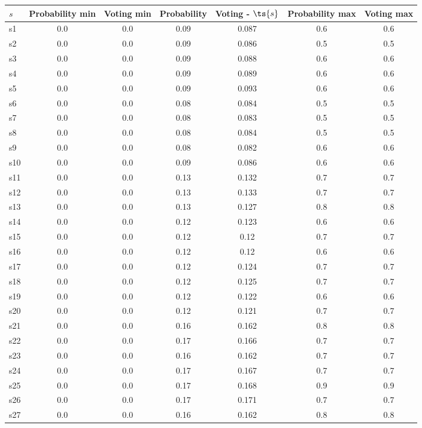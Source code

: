\documentclass{article}
\begin{document}
\noindent\begin{tabular}{|l|c|c|c|c|c|c|}
\hline
$s$& Probability min & Voting min & Probability & Voting - $\ts{s}$ & Probability max & Voting max\\
\hline
s1 &0.0 & 0.0 & 0.09 & 0.087 & 0.6 & 0.6\\
\hline
s2 &0.0 & 0.0 & 0.09 & 0.086 & 0.5 & 0.5\\
\hline
s3 &0.0 & 0.0 & 0.09 & 0.088 & 0.6 & 0.6\\
\hline
s4 &0.0 & 0.0 & 0.09 & 0.089 & 0.6 & 0.6\\
\hline
s5 &0.0 & 0.0 & 0.09 & 0.093 & 0.6 & 0.6\\
\hline
s6 &0.0 & 0.0 & 0.08 & 0.084 & 0.5 & 0.5\\
\hline
s7 &0.0 & 0.0 & 0.08 & 0.083 & 0.5 & 0.5\\
\hline
s8 &0.0 & 0.0 & 0.08 & 0.084 & 0.5 & 0.5\\
\hline
s9 &0.0 & 0.0 & 0.08 & 0.082 & 0.6 & 0.6\\
\hline
s10 &0.0 & 0.0 & 0.09 & 0.086 & 0.6 & 0.6\\
\hline
s11 &0.0 & 0.0 & 0.13 & 0.132 & 0.7 & 0.7\\
\hline
s12 &0.0 & 0.0 & 0.13 & 0.133 & 0.7 & 0.7\\
\hline
s13 &0.0 & 0.0 & 0.13 & 0.127 & 0.8 & 0.8\\
\hline
s14 &0.0 & 0.0 & 0.12 & 0.123 & 0.6 & 0.6\\
\hline
s15 &0.0 & 0.0 & 0.12 & 0.12 & 0.7 & 0.7\\
\hline
s16 &0.0 & 0.0 & 0.12 & 0.12 & 0.6 & 0.6\\
\hline
s17 &0.0 & 0.0 & 0.12 & 0.124 & 0.7 & 0.7\\
\hline
s18 &0.0 & 0.0 & 0.12 & 0.125 & 0.7 & 0.7\\
\hline
s19 &0.0 & 0.0 & 0.12 & 0.122 & 0.6 & 0.6\\
\hline
s20 &0.0 & 0.0 & 0.12 & 0.121 & 0.7 & 0.7\\
\hline
s21 &0.0 & 0.0 & 0.16 & 0.162 & 0.8 & 0.8\\
\hline
s22 &0.0 & 0.0 & 0.17 & 0.166 & 0.7 & 0.7\\
\hline
s23 &0.0 & 0.0 & 0.16 & 0.162 & 0.7 & 0.7\\
\hline
s24 &0.0 & 0.0 & 0.17 & 0.167 & 0.7 & 0.7\\
\hline
s25 &0.0 & 0.0 & 0.17 & 0.168 & 0.9 & 0.9\\
\hline
s26 &0.0 & 0.0 & 0.17 & 0.171 & 0.7 & 0.7\\
\hline
s27 &0.0 & 0.0 & 0.16 & 0.162 & 0.8 & 0.8\\

\end{tabular}
\end{document}
